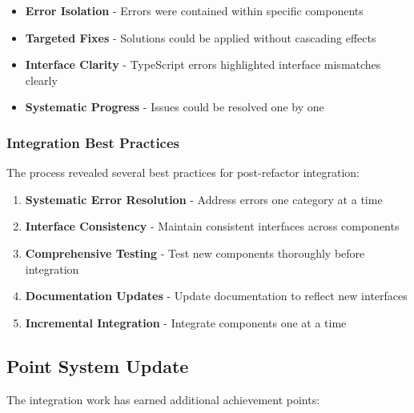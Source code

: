 \documentclass[11pt]{article}
\begin{document}
\begin{itemize}
\item \textbf{Error Isolation} - Errors were contained within specific components
\item \textbf{Targeted Fixes} - Solutions could be applied without cascading effects
\item \textbf{Interface Clarity} - TypeScript errors highlighted interface mismatches clearly
\item \textbf{Systematic Progress} - Issues could be resolved one by one
\end{itemize}

\subsubsection{Integration Best Practices}

The process revealed several best practices for post-refactor integration:

\begin{enumerate}
\item \textbf{Systematic Error Resolution} - Address errors one category at a time
\item \textbf{Interface Consistency} - Maintain consistent interfaces across components
\item \textbf{Comprehensive Testing} - Test new components thoroughly before integration
\item \textbf{Documentation Updates} - Update documentation to reflect new interfaces
\item \textbf{Incremental Integration} - Integrate components one at a time
\end{enumerate}

\subsection{Point System Update}

The integration work has earned additional achievement points:
\end{document}
